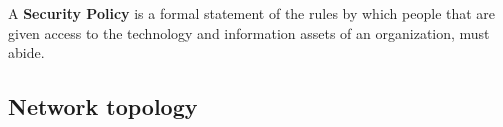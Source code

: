 A \textbf{Security Policy} is a formal statement of the rules by which people that are given access to the technology and information assets of an organization, must abide.
%
%
%

\subsection{Network topology}

%

